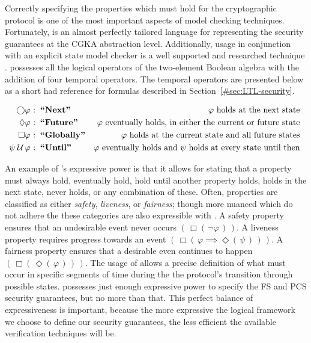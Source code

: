 Correctly specifying the properties which must hold for the cryptographic protocol is one of the most important aspects of model checking techniques.
Fortunately,  \autocite{4567924} is an almost perfectly tailored language for representing the security guarantees at the CGKA abstraction level.
Additionally,  usage in conjunction with an explicit state model checker is a well supported and researched technique \autocite{clarke1994another, biere1999symbolic, bloem1999efficient}.
 possesses all the logical operators of the two-element Boolean algebra with the addition of four temporal operators.
The temporal operators are presented below as a short had reference for formulas described in Section\ \ref{#sec:LTL-security}.

\[
\begin{aligned}[t]
                 \bigcirc & \varphi & \!\!\!\!\textrm{:} & \;\;\textbf{``Next''}     & \varphi\textrm{ holds at the next state} \hfill~ &\\
                 \Diamond & \varphi & \!\!\!\!\textrm{:} & \;\;\textbf{``Future''}   & \varphi\textrm{ eventually holds, in either the current or future state} \hfill~ &\\
                 \Box     & \varphi & \!\!\!\!\textrm{:} & \;\;\textbf{``Globally''} & \varphi\textrm{ holds at the current state and all future states} \hfill~ &\\
  \psi \;{\mathcal {U}}\, & \varphi & \!\!\!\!\textrm{:} & \;\;\textbf{``Until''}    & \varphi\textrm{ eventually holds and $\psi$ holds at every state until then} \hfill~ &\\
\end{aligned}
\]

An example of 's expressive power is that it allows for stating that a property must always hold, eventually hold, hold until another property holds, holds in the next state, never holds, or any combination of these.
Often, properties are classified as either \emph{safety}, \emph{liveness}, or \emph{fairness}; though more nuanced which do not adhere the these categories are also expressible with .
A safety property ensures that an undesirable event never occurs \((\, \Box(\,\neg\varphi \,) \,)\).
A liveness property requires progress towards an event \((\, \Box(\, \varphi \implies \Diamond(\,\psi \,) \,) \,)\).
A fairness property ensures that a desirable even continues to happen \((\, \Box(\, \Diamond(\,\varphi \,) \,) \,)\).
The usage of  allows a precise definition of what must occur in specific segments of time during the the protocol's transition through possible states.
 possesses just enough expressive power to specify the FS and PCS security guarantees, but no more than that.
This perfect balance of expressiveness is important, because the more expressive the logical framework we choose to define our security guarantees, the less efficient the available verification techniques will be.
